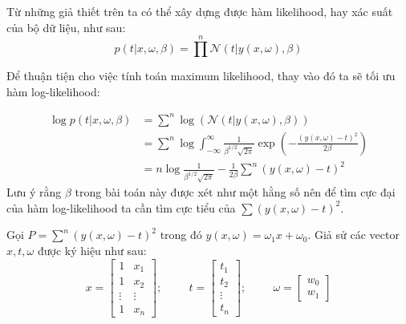 \documentclass[a4paper, 12pt]{article}  %
\begin{document}
Từ những giả thiết trên ta có thể xây dựng được hàm likelihood, hay xác suất của bộ dữ liệu, như sau:
\[p(t | x, \omega, \beta) = \prod^n \mathcal{N}(t | y(x, \omega), \beta)\]

Để thuận tiện cho việc tính toán maximum likelihood, thay vào đó ta sẽ tối ưu hàm log-likelihood:

\begin{align*}
    \log p(t | x, \omega, \beta) &= \sum^n \log (\mathcal{N}(t | y(x, \omega), \beta))\\
    &= \sum^n \log \int^\infty_{-\infty} \frac{1}{\beta^{1/2} \sqrt{2 \pi}} \exp \left( -\frac{(y(x, \omega) - t)^2}{2 \beta} \right)\\
    &= n \log \frac{1}{\beta^{1/2} \sqrt{2 \pi}} - \frac{1}{2 \beta} \sum^n (y(x, \omega) - t)^2
\end{align*}
Lưu ý rằng $\beta$ trong bài toán này được xét như một hằng số nên để tìm cực đại của hàm log-likelihood ta cần tìm cực tiểu của \(\sum (y(x, \omega) - t)^2\). 

Gọi \(P = \sum^n (y(x, \omega) - t)^2\) trong đó \(y(x, \omega) = \omega_1 x + \omega_0\). Giả sử các vector $x, t, \omega$ được ký hiệu như sau:
$$ x =
\begin{bmatrix}
1 & x_1\\
1 & x_2\\
\vdots & \vdots\\
1 & x_n
\end{bmatrix}
;
\hspace{1cm}
t =
\begin{bmatrix}
t_1\\
t_2\\
\vdots\\
t_n
\end{bmatrix}
;
\hspace{1cm}
\omega =
\begin{bmatrix}
    w_0\\
    w_1
\end{bmatrix}
$$
\end{document}
